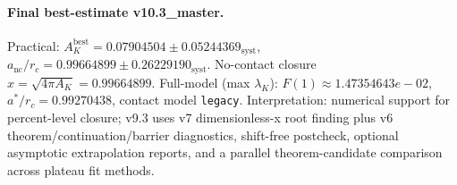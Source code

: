 \paragraph{Final best-estimate v10.3_master.}
Practical: $A_K^{\mathrm{best}} = 0.07904504 \pm 0.05244369_{\mathrm{syst}}$, $a_{\mathrm{nc}}/r_c = 0.99664899 \pm 0.26229190_{\mathrm{syst}}$.
No-contact closure $x = \sqrt{4\pi A_K} = 0.99664899$.
Full-model (max $\lambda_K$): $F(1) \approx 1.47354643e-02$, $a^*/r_c = 0.99270438$, contact model \texttt{legacy}.
Interpretation: numerical support for percent-level closure; v9.3 uses v7 dimensionless-x root finding plus v6 theorem/continuation/barrier diagnostics, shift-free postcheck, optional asymptotic extrapolation reports, and a parallel theorem-candidate comparison across plateau fit methods.
